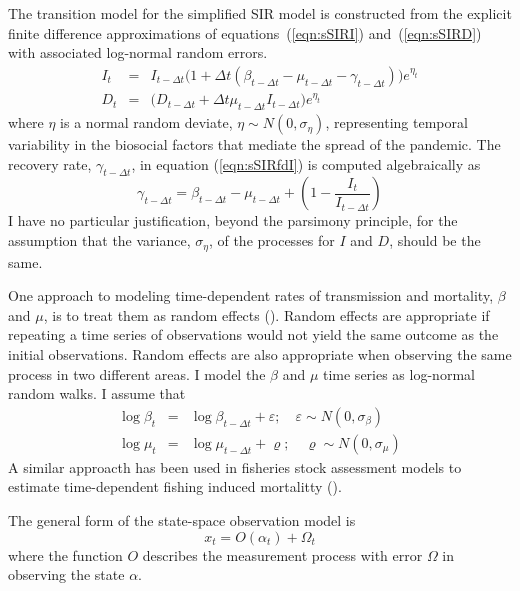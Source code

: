 \documentclass[12pt,letterpaper]{article}
\begin{document}
The transition model for the simplified SIR model is constructed from
the explicit finite difference
approximations of equations~(\ref{eqn:sSIRI}) and~(\ref{eqn:sSIRD}) 
with associated log-normal
random errors.
\begin{eqnarray}
\label{eqn:sSIRfdI}
I_t &=& I_{t-\Delta t}\big(1+\Delta t(\beta_{t-\Delta t} - \mu_{t-\Delta t}
- \gamma_{t-\Delta t})\big)e^{\eta_t}\\
\label{eqn:sSIRfdD}
D_t &=& \big(D_{t-\Delta t} + \Delta t \mu_{t-\Delta t}I_{t-\Delta
t}\big)e^{\eta_t}
\end{eqnarray}
where $\eta$ is a normal random deviate, $\eta\sim
N(0,\sigma_\eta)$, representing temporal variability in the biosocial
factors that mediate the spread of the pandemic. 
The recovery rate, $\gamma_{t-\Delta t}$, in equation
(\ref{eqn:sSIRfdI}) is computed algebraically as
\begin{equation}
\gamma_{t-\Delta t} = \beta_{t-\Delta t} - \mu_{t-\Delta t} +
(1-\frac{I_t}{I_{t-\Delta t}})
\end{equation}
I have no particular
justification, beyond the parsimony principle, for the assumption that
the variance, $\sigma_\eta$, of the processes for $I$ and $D$, should be the
same.

One approach to modeling time-dependent rates of transmission and
mortality, $\beta$ and $\mu$, is to treat them as random effects
(\cite{Skaug2006}). Random effects are appropriate if repeating a time
series of observations would not yield the same outcome as the initial
observations. Random effects are also appropriate when observing
the same process in two different areas. I model the  $\beta$ and
$\mu$ time series as log-normal random walks. I assume that
\begin{eqnarray}
\log\beta_t &=& \log\beta_{t-\Delta t}+\varepsilon;\quad \varepsilon\sim 
N(0,\sigma_\beta)\\
\log\mu_t &=& \log\mu_{t-\Delta t}+\varrho;\quad \varrho\sim
N(0,\sigma_\mu)
\end{eqnarray}
A similar approacth has been used in fisheries stock assessment models
to estimate time-dependent fishing induced mortalitty
(\cite{Sibert2017,Nielsen2014b}).

The general form of the state-space observation model is
\begin{equation}
x_t = O(\alpha_t) + \Omega_t
\end{equation}
where the function $O$ describes the measurement process with
error $\Omega$ in observing the state $\alpha$.
\end{document}
